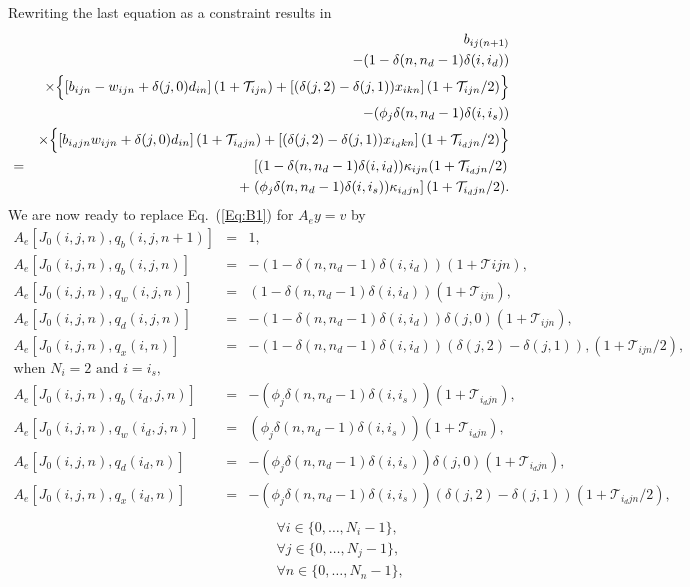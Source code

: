 \documentclass{report}[fleqn,11pt]
\begin{document}
Rewriting the last equation as a constraint results in
\begin{eqnarray}
	&&b_{ij(n+1)} 
	  \nonumber  \\
	&& - (1 - \delta(n, n_d-1)\delta(i, i_d)) \nonumber\\
	&& \times \Bigl\{ \left[b_{ijn} - w_{ijn} + \delta(j, 0)d_{in} \right](1 + \mathcal{T}_{ijn})
	+ \left[(\delta(j, 2) - \delta(j, 1))x_{ikn}\right](1 + \mathcal{T}_{ijn}/2) \Bigr\}
	\nonumber \\
	&&- (\phi_j\delta(n, n_d-1)\delta(i, i_s)) \nonumber \\
	&& \times \Bigl\{ \left[b_{i_djn} w_{ijn} + \delta(j, 0)d_{in}\right](1 + \mathcal{T}_{i_djn})
	+ \left[(\delta(j, 2) - \delta(j, 1))x_{i_dkn}\right](1 + \mathcal{T}_{i_djn}/2) \Bigr\}
	\nonumber \\
	&=& \left[(1 - \delta(n, n_d-1)\delta(i, i_d)) \kappa_{ijn} (1 + \mathcal{T}_{i_djn}/2) \right.
	\nonumber\\
	&& + \left.(\phi_j\delta(n, n_d-1)\delta(i, i_s))
	\kappa_{i_djn}\right](1 + \mathcal{T}_{i_djn}/2).
\end{eqnarray}
We are now ready to replace Eq.~(\ref{Eq:B1}) for $A_ey = v$ by
\begin{eqnarray}
        \label{Eq:B2}
        A_e[J_0(i, j, n), q_b(i, j, n+1)] &=& 1, \nonumber \\
        A_e[J_0(i, j, n), q_b(i, j, n)] &=& - (1 - \delta(n, n_d-1)\delta(i, i_d))
		(1 + \mathcal{T}{ijn}), \nonumber \\
        A_e[J_0(i, j, n), q_w(i, j, n)] &=& (1 - \delta(n, n_d-1)\delta(i, i_d))
	(1 + \mathcal{T}_{ijn}),\nonumber \\
        A_e[J_0(i, j, n), q_d(i, j, n)] &=& - (1 - \delta(n, n_d-1)\delta(i, i_d))
		\delta(j, 0) (1 + \mathcal{T}_{ijn}), \nonumber \\
        A_e[J_0(i, j, n), q_x(i, n)] &=& - (1 - \delta(n, n_d-1)\delta(i, i_d))
                (\delta(j, 2) - \delta(j, 1)),
		(1 + \mathcal{T}_{ijn}/2), \nonumber \\
		\text{when $N_i =2$ and $i = i_s$,} && \nonumber\\
        A_e[J_0(i, j, n), q_b(i_d, j, n)] &=& - (\phi_j\delta(n, n_d-1)\delta(i, i_s))
		(1 + \mathcal{T}_{i_djn}), \nonumber \\
        A_e[J_0(i, j, n), q_w(i_d, j, n)] &=& (\phi_j\delta(n, n_d-1)\delta(i, i_s))
	(1 + \mathcal{T}_{i_djn}), \nonumber\\
        A_e[J_0(i, j, n), q_d(i_d, n)] &=&  -(\phi_j\delta(n, n_d-1)\delta(i, i_s))
		\delta(j, 0)(1 + \mathcal{T}_{i_djn}), \nonumber \\
        A_e[J_0(i, j, n), q_x(i_d, n)] &=& - (\phi_j\delta(n, n_d-1)\delta(i, i_s))
                (\delta(j, 2) - \delta(j, 1))
		(1 + \mathcal{T}_{i_djn}/2), \nonumber \\
                \nonumber \\
        &&\qquad\forall i \in \{0,\ldots, N_i-1\},\nonumber\\
        &&\qquad\forall j \in \{0,\ldots, N_j-1\},\nonumber\\
        &&\qquad\forall n \in \{0,\ldots, N_n-1\}, \nonumber
\end{eqnarray}
\end{document}
